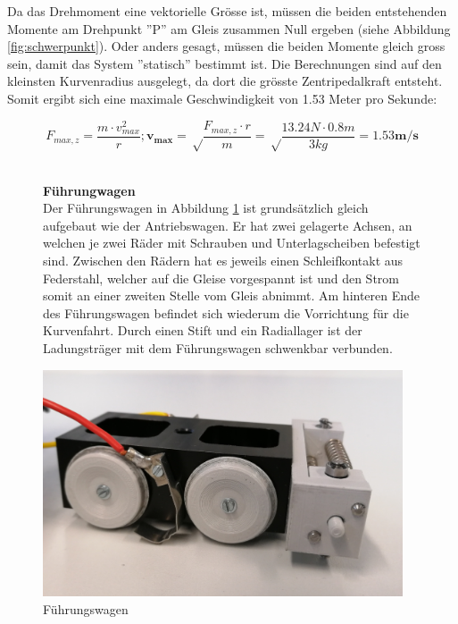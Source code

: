 \documentclass[../../main.tex]{subfiles}
\begin{document}
Da das Drehmoment eine vektorielle Grösse ist, müssen die beiden entstehenden Momente am Drehpunkt ''P'' am Gleis zusammen Null ergeben (siehe Abbildung \ref{fig:schwerpunkt}). Oder anders gesagt, müssen die beiden Momente gleich gross sein, damit das System ''statisch'' bestimmt ist. Die Berechnungen sind auf den kleinsten Kurvenradius ausgelegt, da dort die grösste Zentripedalkraft entsteht. Somit ergibt sich eine maximale Geschwindigkeit von 1.53 Meter pro Sekunde:

$$F_{max, z}=\frac{m \cdot v_{max}^2}{r};\boldsymbol{v_{max}}=\sqrt\frac{F_{max, z}\cdot r}{m}=\sqrt\frac{13.24N \cdot 0.8m}{3kg}=\boldsymbol{1.53m/s}$$\\

\begin{figure}[H]
  \begin{minipage}{.5\textwidth}
    \textbf{Führungwagen}\\
    Der Führungswagen in Abbildung \ref{fig:fuehrungswagen1} ist grundsätzlich gleich aufgebaut wie der Antriebswagen. Er hat zwei gelagerte Achsen, an welchen je zwei Räder mit Schrauben und Unterlagscheiben befestigt sind. Zwischen den Rädern hat es jeweils einen Schleifkontakt aus Federstahl, welcher auf die Gleise vorgespannt ist und den Strom somit an einer zweiten Stelle vom Gleis abnimmt. Am hinteren Ende des Führungswagen befindet sich wiederum die Vorrichtung für die Kurvenfahrt. Durch einen Stift und ein Radiallager ist der Ladungsträger mit dem Führungswagen schwenkbar verbunden.
   \end{minipage}
  \begin{minipage}{.5\textwidth}
    \flushright
    \includegraphics[width=0.95\textwidth]{fuehrungswagen2.JPG}
    \caption {Führungswagen}
    \label{fig:fuehrungswagen1}
    \end{minipage} 
\end{figure} 
\end{document}
